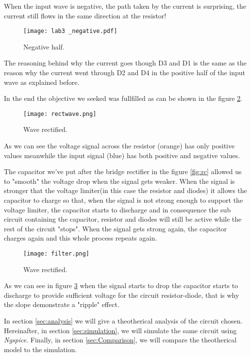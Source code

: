 When the input wave is negative, the path taken by the current is surprising, the current still flows in the same direction at the resistor!
\begin{figure}[h] \centering
    \texttt{[image: lab3 \_negative.pdf]}
    \caption{Negative half.}
    \label{fig:rc3}
\end{figure}

The reasoning behind why the current goes though D3 and D1 is the same as
the reason why the current went through D2 and D4 in the positive half of the input wave as explained before.

In the end the objective we seeked was fullfilled as can be shown in the figure \ref{fig:rc4}.
\begin{figure}[h] \centering
    \texttt{[image: rectwave.png]}
    \caption{Wave rectified.}
    \label{fig:rc4}
\end{figure}

As we can see the voltage signal across the resistor (orange) has only positive values
meanwhile the input signal (blue) has both positive and negative values.

The capacitor we've put after the bridge rectifier in the figure \ref{fig:rc} allowed us to "smooth"
the voltage drop when the signal gets weaker. When the signal is stronger that the voltage limiter(in this case the resistor and diodes)
it allows the capacitor to charge so that, when the signal is not strong enough to support the voltage limiter, the capacitor
starts to discharge and in consequence the sub circuit containing the capacitor, resistor and diodes will still be
active while the rest of the circuit "stops". When the signal gets strong again, the capacitor charges again and this whole process repeats again.
\begin{figure}[h] \centering
    \texttt{[image: filter.png]}
    \caption{Wave rectified.}
    \label{fig:rc5}
\end{figure}

As we can see in figure \ref{fig:rc5} when the signal starts to drop the capacitor starts to discharge to provide
sufficient voltage for the circuit resistor-diode, that is why the slope demonstrate a "ripple" effect.

In section \ref{sec:analysis} we will give a theotherical analysis of the circuit chosen.
Hereinafter, in section \ref{sec:simulation}, we will simulate the same circuit using \emph{Ngspice}.
Finally, in section \ref{sec:Comparison}, we will compare the theotherical model to the simulation.

